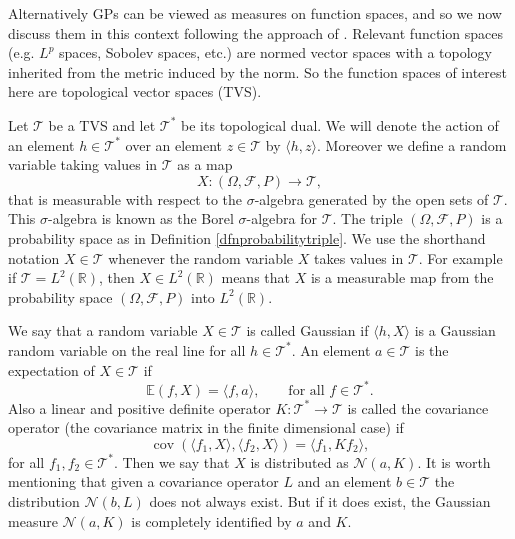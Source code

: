 \documentclass{sfuthesis}
\newcommand{\E}{\mathbb{E}} %
\newcommand{\tvs}{\mathscr{T}} %
\DeclareMathOperator*{\cov}{cov}
\begin{document}
Alternatively GPs can be viewed as  measures on function spaces, and so we now discuss them in this
context following the approach of \cite{lifshits2012lectures}.
Relevant function spaces (e.g. $L^{p}$ spaces, Sobolev spaces, etc.) are 
normed vector spaces with a topology inherited from the metric induced by the norm. So
the function spaces of interest here are topological vector spaces (TVS). 

Let $\mathscr{T}$ be a TVS and  let $\mathscr{T}^{*}$ be its topological dual. 
We will denote the action of an 
element $h\in\tvs^{*}$ over an element $z\in\tvs$ by $\langle h,z\rangle$. Moreover 
we  define a random variable taking values in $\tvs$ as a map 
\begin{equation*}
X:(\Omega,\mathscr{F},P)\longrightarrow\tvs,
\end{equation*}
that is measurable with respect to the $\sigma$-algebra generated by the open sets
of $\tvs$. This $\sigma$-algebra is known as the Borel $\sigma$-algebra for $\tvs$.
The triple $(\Omega,\mathscr{F},P)$ is a probability space as in Definition \ref{dfnprobabilitytriple}. 
We use the shorthand notation  $X\in\tvs$ whenever the random variable $X$ takes values in $\tvs$. 
For example if $\tvs=L^{2}(\mathbb{R})$,  then  $X\in L^{2}(\mathbb{R})$ means that $X$ is a measurable
map from the probability space $(\Omega,\mathscr{F},P)$ into $L^{2}(\mathbb{R})$.

We say that a random variable $X\in\tvs$ is called Gaussian if $\langle h,X\rangle$ is
a Gaussian random variable on the real line for all $h\in\tvs^{*}$. An element $a\in\tvs$ is the 
expectation of $X\in\tvs$ if 
\begin{equation*}
\E(f,X)=\langle f, a\rangle,\qquad\text{for all }f\in\tvs^{*}.
\end{equation*}
Also a linear and positive definite operator $K:\tvs^{*}\longrightarrow \tvs$ 
is called the covariance operator (the covariance
matrix in the finite dimensional case) if
\begin{equation*}
\cov(\langle f_{1},X\rangle,\langle f_{2},X\rangle)=\langle f_{1},Kf_{2}\rangle,
\end{equation*}
for all $f_{1},f_{2}\in\tvs^{*}$. Then we say that $X$ is distributed as 
$\mathcal{N}(a,K)$. It is worth mentioning
that given a covariance operator $L$ and an element $b\in\tvs$ the distribution $\mathcal{N}(b,L)$
does not always exist\cite{lifshits2013gaussian}. But if it does exist, the  Gaussian measure $\mathcal{N}(a,K)$ is completely
identified by $a$ and $K$.
\newline
\end{document}
